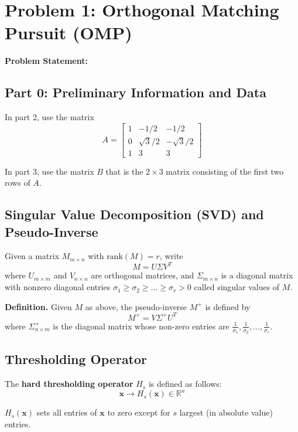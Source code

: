 \clearpage
\section*{Problem 1: Orthogonal Matching Pursuit (OMP)}

\textbf{Problem Statement:} 

\subsection*{Part 0: Preliminary Information and Data}

In part 2, use the matrix
$$A = \begin{bmatrix} 
1 & -1/2 & -1/2 \\
0 & \sqrt{3}/2 & -\sqrt{3}/2 \\
1 & 3 & 3
\end{bmatrix}$$

In part 3, use the matrix $B$ that is the $2 \times 3$ matrix consisting of the first two rows of $A$.

\subsection*{Singular Value Decomposition (SVD) and Pseudo-Inverse}

Given a matrix $M_{m \times n}$ with $\text{rank}(M) = r$, write
$$M = U\Sigma V^T$$
where $U_{m \times m}$ and $V_{n \times n}$ are orthogonal matrices, and $\Sigma_{m \times n}$ is a diagonal matrix with nonzero diagonal entries $\sigma_1 \geq \sigma_2 \geq \ldots \geq \sigma_r > 0$ called singular values of $M$.

\textbf{Definition.} Given $M$ as above, the pseudo-inverse $M^+$ is defined by
$$M^+ = V\Sigma^+ U^T$$
where $\Sigma^+_{n \times m}$ is the diagonal matrix whose non-zero entries are $\frac{1}{\sigma_1}, \frac{1}{\sigma_2}, \ldots, \frac{1}{\sigma_r}$.

\subsection*{Thresholding Operator}

The \textbf{hard thresholding operator} $H_s$ is defined as follows:
$$\mathbf{x} \to H_s(\mathbf{x}) \in \mathbb{R}^n$$

$H_s(\mathbf{x})$ sets all entries of $\mathbf{x}$ to zero except for $s$ largest (in absolute value) entries.

